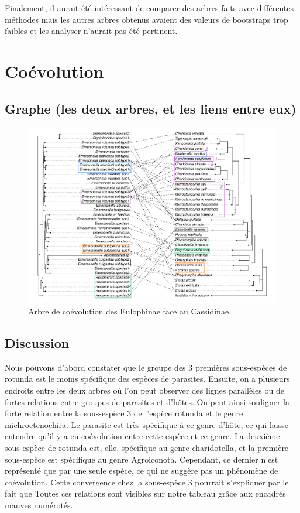 \documentclass[a4paper, 12pt]{article}
\begin{document}
Finalement, il aurait été intéressant de comparer des arbres faits avec différentes méthodes mais les autres arbres obtenus avaient des valeurs de bootstraps trop faibles et les analyser n’aurait pas été pertinent.


\section{Coévolution}

\subsection{Graphe (les deux arbres, et les liens entre eux)}


\begin{landscape}
    \begin{figure}[htbp]
    \centering
    \includegraphics[scale=0.8]{cophylo_color.pdf}
    \caption{\small Arbre de coévolution des Eulophinae face au Cassidinae.}
    \label{cophylo_tree}
\end{figure}
\end{landscape}

\subsection{Discussion}
Nous pouvons d'abord constater que le groupe des 3 premières sous-espèces de rotunda est le moins spécifique des espèces de parasites. Ensuite, on a plusieurs endroits entre les deux arbres où l'on peut observer des lignes parallèles ou de fortes relations entre groupes de parasites et d'hôtes. On peut ainsi souligner la forte relation entre la sous-espèce 3 de l'espèce rotunda et le genre michroctenochira. Le parasite est très spécifique à ce genre d'hôte, ce qui laisse entendre qu'il y a eu coévolution entre cette espèce et ce genre. La deuxième sous-espèce de rotunda est, elle, spécifique au genre charidotella, et la première sous-espèce est spécifique au genre Agroiconota. Cependant, ce dernier n'est représenté que par une seule espèce, ce qui ne suggère pas un phénomène de coévolution.
Cette convergence chez la sous-espèce 3 pourrait s'expliquer par le fait que
Toutes ces relations sont visibles sur notre tableau grâce aux encadrés mauves numérotés.
\end{document}
